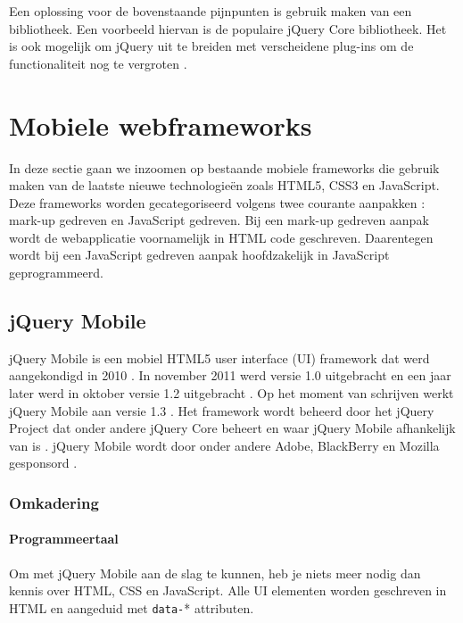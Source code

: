 Een oplossing voor de bovenstaande pijnpunten is gebruik maken van een bibliotheek. Een voorbeeld hiervan is de populaire jQuery Core bibliotheek. Het is ook mogelijk om jQuery  uit te breiden met verscheidene plug-ins om de functionaliteit nog te vergroten \cite{McFarland2011}.


\section{Mobiele webframeworks}
\label{sec:mobiele-frameworks}
In deze sectie gaan we inzoomen op bestaande mobiele frameworks die gebruik maken van de laatste nieuwe technologieën zoals HTML5, CSS3 en JavaScript. Deze frameworks worden gecategoriseerd volgens twee courante aanpakken \cite{Oehlman2011}: mark-up gedreven en JavaScript gedreven. Bij een mark-up gedreven aanpak wordt de webapplicatie voornamelijk in HTML code geschreven. Daarentegen wordt bij een JavaScript gedreven aanpak hoofdzakelijk in JavaScript geprogrammeerd.

\subsection{jQuery Mobile}
jQuery Mobile is een mobiel HTML5 user interface (UI) framework dat werd aangekondigd in 2010 \cite{Resig2010}. In november 2011 werd versie 1.0 uitgebracht \cite{Parker2011} en een jaar later werd in oktober versie 1.2 uitgebracht \cite{Parker2012}. Op het moment van schrijven werkt jQuery Mobile aan versie 1.3 \cite{Parker2012a}. Het framework wordt beheerd door het jQuery Project dat onder andere jQuery Core beheert en waar jQuery Mobile afhankelijk van is \cite{JQuery2012}. jQuery Mobile wordt door onder andere Adobe, BlackBerry en Mozilla gesponsord \cite{JQuery2012a}.

\subsubsection{Omkadering}
\paragraph{Programmeertaal}
Om met jQuery Mobile aan de slag te kunnen, heb je niets meer nodig dan kennis over HTML, CSS en JavaScript. Alle UI elementen worden geschreven in HTML en aangeduid met \texttt{data-}* attributen.

